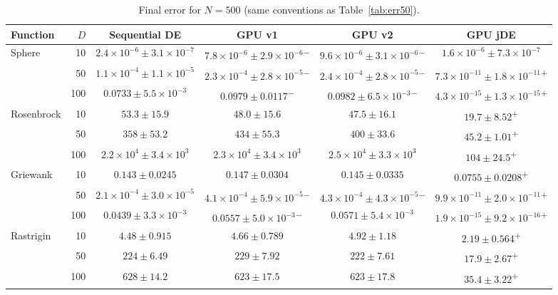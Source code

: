 \documentclass[conference]{IEEEtran}
\begin{document}
\begin{table}[p]
\vspace{1.5em}
\caption{Final error for $N=500$ (same conventions as Table~\ref{tab:err50}).}
\label{tab:err500}
\begin{tabular}{lrcccc}
\toprule
Function & $D$ & Sequential DE & GPU v1 & GPU v2 & GPU jDE\\
\midrule
Sphere & 10 & $2.4{\times}10^{-6}\pm3.1{\times}10^{-7}$ & $7.8{\times}10^{-6}\pm2.9{\times}10^{-6}$\textsuperscript{$-$} & $9.6{\times}10^{-6}\pm3.1{\times}10^{-6}$\textsuperscript{$-$} & $1.6{\times}10^{-6}\pm7.3{\times}10^{-7}$\\
 & 50 & $1.1{\times}10^{-4}\pm1.1{\times}10^{-5}$ & $2.3{\times}10^{-4}\pm2.8{\times}10^{-5}$\textsuperscript{$-$} & $2.4{\times}10^{-4}\pm2.8{\times}10^{-5}$\textsuperscript{$-$} & $7.3{\times}10^{-11}\pm1.8{\times}10^{-11}$\textsuperscript{$+$}\\
 & 100 & $0.0733\pm5.5{\times}10^{-3}$ & $0.0979\pm0.0117$\textsuperscript{$-$} & $0.0982\pm6.5{\times}10^{-3}$\textsuperscript{$-$} & $4.3{\times}10^{-15}\pm1.3{\times}10^{-15}$\textsuperscript{$+$}\\
\midrule
Rosenbrock & 10 & $53.3\pm15.9$ & $48.0\pm15.6$ & $47.5\pm16.1$ & $19.7\pm8.52$\textsuperscript{$+$}\\
 & 50 & $358\pm53.2$ & $434\pm55.3$ & $400\pm33.6$ & $45.2\pm1.01$\textsuperscript{$+$}\\
 & 100 & $2.2{\times}10^{4}\pm3.4{\times}10^{3}$ & $2.3{\times}10^{4}\pm3.4{\times}10^{3}$ & $2.5{\times}10^{4}\pm3.3{\times}10^{3}$ & $104\pm24.5$\textsuperscript{$+$}\\
\midrule
Griewank & 10 & $0.143\pm0.0245$ & $0.147\pm0.0304$ & $0.145\pm0.0335$ & $0.0755\pm0.0208$\textsuperscript{$+$}\\
 & 50 & $2.1{\times}10^{-4}\pm3.0{\times}10^{-5}$ & $4.1{\times}10^{-4}\pm5.9{\times}10^{-5}$\textsuperscript{$-$} & $4.3{\times}10^{-4}\pm4.3{\times}10^{-5}$\textsuperscript{$-$} & $9.9{\times}10^{-11}\pm2.0{\times}10^{-11}$\textsuperscript{$+$}\\
 & 100 & $0.0439\pm3.3{\times}10^{-3}$ & $0.0557\pm5.0{\times}10^{-3}$\textsuperscript{$-$} & $0.0571\pm5.4{\times}10^{-3}$ & $1.9{\times}10^{-15}\pm9.2{\times}10^{-16}$\textsuperscript{$+$}\\
\midrule
Rastrigin & 10 & $4.48\pm0.915$ & $4.66\pm0.789$ & $4.92\pm1.18$ & $2.19\pm0.564$\textsuperscript{$+$}\\
 & 50 & $224\pm6.49$ & $229\pm7.92$ & $222\pm7.61$ & $17.9\pm2.67$\textsuperscript{$+$}\\
 & 100 & $628\pm14.2$ & $623\pm17.5$ & $623\pm17.8$ & $35.4\pm3.22$\textsuperscript{$+$}\\
\bottomrule
\end{tabular}
\end{table}
\end{document}

